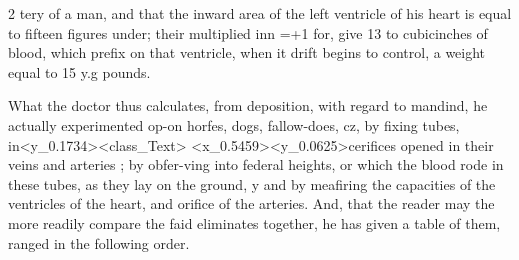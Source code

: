 \documentclass[10pt]{article}
\begin{document}
\begin{multicols}{2}\raggedcolumns
tery of a man, and that the inward area of the left ventricle of his heart is equal to fifteen figures under; their multiplied inn =+1 for, give 13 to cubicinches of blood, which prefix on that ventricle, when it drift begins to control, a weight equal to 15 y.g pounds.

\end{multicols}
What the doctor thus calculates, from deposition, with regard to mandind, he actually experimented op-on horfes, dogs, fallow-does, cz, by fixing tubes, in\textless{}y\_0.1734\textgreater{}\textless{}class\_Text\textgreater{} \textless{}x\_0.5459\textgreater{}\textless{}y\_0.0625\textgreater{}cerifices opened in their veins and arteries ; by obfer-ving into federal heights, or which the blood rode in these tubes, as they lay on the ground, y and by meafiring the capacities of the ventricles of the heart, and orifice of the arteries. And, that the reader may the more readily compare the faid eliminates together, he has given a table of them, ranged in the following order.
\end{document}
